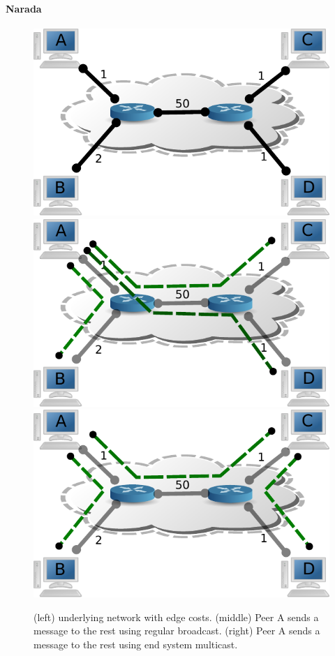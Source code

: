 \documentclass[acmcsur,acmnow]{acmtrans2m}
\begin{document}
\paragraph*{\bf Narada}

\begin{figure}
\centering
  \includegraphics[scale=0.4]{img/algorithms/narada}
  \includegraphics[scale=0.4]{img/algorithms/narada2}
  \includegraphics[scale=0.4]{img/algorithms/narada3}
\caption{(left) underlying network with edge costs. (middle) Peer A sends a message to the rest using regular broadcast. (right) Peer A sends a message to the rest using end system multicast.}
\label{fig:narada}
\end{figure}
\end{document}
